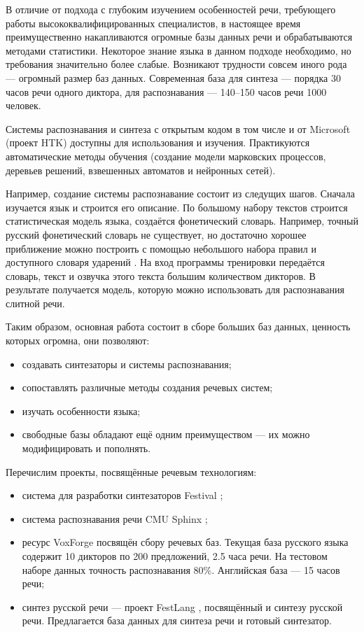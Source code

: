 В отличие от подхода с глубоким изучением особенностей речи, требующего
работы высококвалифицированных специалистов, в настоящее время
преимущественно накапливаются огромные базы данных речи и
обрабатываются методами статистики. Некоторое знание языка в данном
подходе необходимо, но требования значительно более слабые. Возникают
трудности совсем иного рода --- огромный размер баз данных. Современная
база для синтеза --- порядка 30 часов речи одного диктора, для
распознавания --- 140--150 часов речи 1000 человек.

Системы распознавания и синтеза с открытым кодом в том числе и от
Microsoft (проект HTK) доступны для использования и изучения.
Практикуются автоматические методы обучения (создание модели марковских
процессов, деревьев решений, взвешенных автоматов и нейронных сетей).

Например, создание системы распознавание состоит из следущих шагов.
Сначала изучается язык и строится его описание. По большому набору
текстов строится статистическая модель языка, создаётся фонетический
словарь. Например, точный русский фонетический словарь не существует, но
достаточно хорошее приближение можно построить с помощью небольшого
набора правил и доступного словаря ударений \cite{zaliznyak}. На
вход программы тренировки передаётся словарь, текст и озвучка этого
текста большим количеством дикторов. В результате получается модель,
которую можно использовать для распознавания слитной речи.

Таким образом, основная работа состоит в сборе больших баз данных,
ценность которых огромна, они позволяют:

\begin{itemize}
\item создавать синтезаторы и системы распознавания;
\item сопоставлять различные методы создания речевых систем;
\item изучать особенности языка;
\item свободные базы обладают ещё одним преимуществом --- их можно модифицировать и пополнять.
\end{itemize}

Перечислим проекты, посвящённые речевым технологиям:

\begin{itemize}
\item система для разработки синтезаторов Festival \cite{festival};
\item система распознавания речи CMU Sphinx \cite{sphinx};
\item ресурс VoxForge \cite{voxforge} посвящён сбору речевых баз.
Текущая база русского языка содержит 10 дикторов по 200 предложений, 2.5
часа речи. На тестовом наборе данных точность распознавания 80\%.
Английская база --- 15 часов речи;
\item синтез русской речи --- проект FestLang \cite{festlang},
посвящённый и синтезу русской речи. Предлагается база данных для синтеза
речи и готовый синтезатор.
\end{itemize}


